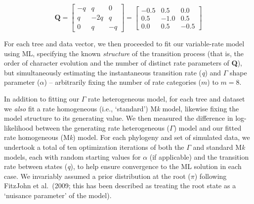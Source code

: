 \documentclass[fleqn,10pt,lineno]{wlpeerj} %
\begin{document}
\[\mathbf{Q} = \begin{bmatrix}-q & q & 0 \\ q & -2q &  q \\ 0 &  q & -q \end{bmatrix} = \begin{bmatrix}-0.5 & 0.5 & 0.0\\ 0.5 & -1.0 & 0.5 \\ 0.0 & 0.5 & -0.5\end{bmatrix}\]

For each tree and data vector, we then proceeded to fit our variable-rate model using ML, specifying the known \emph{structure} of the transition process (that is, the order of character evolution and the number of distinct rate parameters of \textbf{Q}), but simultaneously estimating the instantaneous transition rate (\emph{q}) and \(\Gamma\) shape parameter (\(\alpha\)) -- arbitrarily fixing the number of rate categories (\(m\)) to \(m = 8\).

In addition to fitting our \(\Gamma\) rate heterogeneous model, for each tree and dataset we \emph{also} fit a rate homogeneous (i.e., `standard') M\emph{k} model, likewise fixing the model structure to its generating value. We then measured the difference in log-likelihood between the generating rate heterogeneous (\(\Gamma\)) model and our fitted rate homogeneous (M\emph{k}) model. For each phylogeny and set of simulated data, we undertook a total of ten optimization iterations of both the \(\Gamma\) and standard M\emph{k} models, each with random starting values for \(\alpha\) (if applicable) and the transition rate between states (\emph{q}), to help ensure convergence to the ML solution in each case. We invariably assumed a prior distribution at the root (\(\pi\)) following FitzJohn et al.~(2009; this has been described as treating the root state as a `nuisance parameter' of the model).
\end{document}
